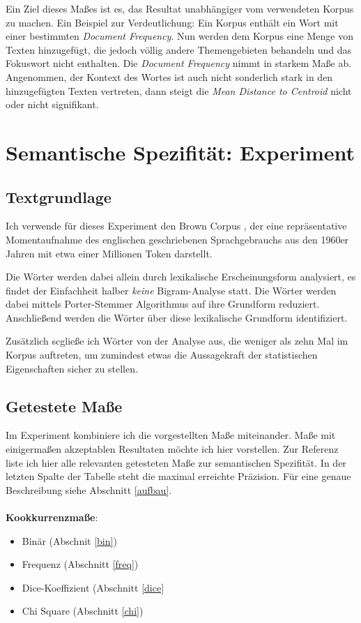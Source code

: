 \documentclass[11pt,numbers=noenddot]{scrartcl}
\begin{document}
Ein Ziel dieses Maßes ist es, das Resultat unabhängiger vom verwendeten Korpus zu machen. Ein Beispiel zur Verdeutlichung: Ein Korpus enthält ein Wort mit einer bestimmten \emph{Document Frequency}. Nun werden dem Korpus eine Menge von Texten hinzugefügt, die jedoch völlig andere Themengebieten behandeln und das Fokuswort nicht enthalten. Die \emph{Document Frequency} nimmt in starkem Maße ab. Angenommen, der Kontext des Wortes ist auch nicht sonderlich stark in den hinzugefügten Texten vertreten, dann steigt die \emph{Mean Distance to Centroid} nicht oder nicht signifikant.

\section{Semantische Spezifität: Experiment}

\subsection{Textgrundlage}

Ich verwende für dieses Experiment den Brown Corpus \citep{francis1979brown}, der eine repräsentative Momentaufnahme des englischen geschriebenen Sprachgebrauchs aus den 1960er Jahren mit etwa einer Millionen Token darstellt.

Die Wörter werden dabei allein durch lexikalische Erscheinungsform analysiert, es findet der Einfachheit halber \emph{keine} Bigram-Analyse statt. Die Wörter werden dabei mittels Porter-Stemmer Algorithmus \citep{Porter:1997:ASS:275537.275705} auf ihre Grundform reduziert. Anschließend werden die Wörter über diese lexikalische Grundform identifiziert.

Zusätzlich scgließe ich Wörter von der Analyse aus, die weniger als zehn Mal im Korpus auftreten, um zumindest etwas die Aussagekraft der statistischen Eigenschaften sicher zu stellen.

\subsection{Getestete Maße}

Im Experiment kombiniere ich die vorgestellten Maße miteinander. Maße mit einigermaßen akzeptablen Resultaten möchte ich hier vorstellen. Zur Referenz liste ich hier alle relevanten getesteten Maße zur semantischen Spezifität. In der letzten Spalte der Tabelle steht die maximal erreichte Präzision. Für eine genaue Beschreibung siehe Abschnitt \ref{aufbau}.
\\\\
\textbf{Kookkurrenzmaße}:
\begin{itemize}
    \item Binär (Abschnit \ref{bin})
    \item Frequenz (Abschnitt \ref{freq})
    \item Dice-Koeffizient (Abschnitt \ref{dice}
    \item Chi Square (Abschnitt \ref{chi})
\end{itemize}
\end{document}
